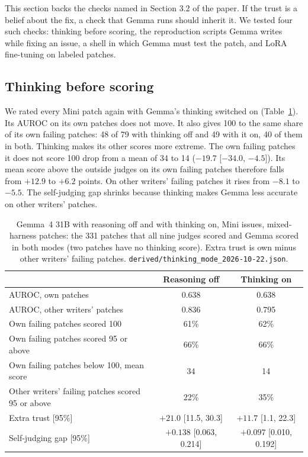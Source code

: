 \documentclass[10pt,letterpaper]{article}
\begin{document}
This section backs the checks named in Section 3.2 of the paper. If the trust is a belief about the fix, a check that Gemma runs should
inherit it. We tested four such checks: thinking before scoring, the reproduction scripts Gemma writes while fixing an
issue, a shell in which Gemma must test the patch, and LoRA fine-tuning on labeled patches.

\subsection*{Thinking before scoring}

We rated every Mini patch again with Gemma's thinking switched on (Table~\ref{tab:think}). Its AUROC on its own patches
does not move. It also gives 100 to the same share of its own failing patches: 48 of 79 with thinking off and 49 with
it on, 40 of them in both. Thinking makes its other scores more extreme. The own failing patches it does not score 100
drop from a mean of 34 to 14 ($-19.7$ [$-34.0$, $-4.5$]). Its mean score above the outside judges on its own failing patches therefore falls
from $+12.9$ to $+6.2$ points. On other writers' failing patches it rises from $-8.1$ to $-5.5$. The self-judging gap
shrinks because thinking makes Gemma less accurate on other writers' patches.

\begin{table}[H]
\centering
\small
\caption{Gemma~4 31B with reasoning off and with thinking on, Mini issues, mixed-harness patches: the 331 patches that
all nine judges scored and Gemma scored in both modes (two patches have no thinking score). Extra trust is own minus
other writers' failing patches. \texttt{derived/thinking\_mode\_2026-10-22.json}.}
\label{tab:think}
\begin{tabular}{@{}lcc@{}}
\toprule
& Reasoning off & Thinking on \\
\midrule
AUROC, own patches & 0.638 & 0.638 \\
AUROC, other writers' patches & 0.836 & 0.795 \\
Own failing patches scored 100 & 61\% & 62\% \\
Own failing patches scored 95 or above & 66\% & 66\% \\
Own failing patches below 100, mean score & 34 & 14 \\
Other writers' failing patches scored 95 or above & 22\% & 35\% \\
Extra trust [95\%] & $+21.0$ [11.5, 30.3] & $+11.7$ [1.1, 22.3] \\
Self-judging gap [95\%] & $+0.138$ [0.063, 0.214] & $+0.097$ [0.010, 0.192] \\
\bottomrule
\end{tabular}
\end{table}
\end{document}
